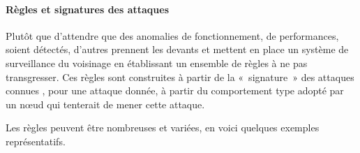        \paragraph{Règles et signatures des attaques}
Plutôt que d'attendre que des anomalies de fonctionnement, de performances, soient détectés, d'autres \IDS prennent les devants et mettent en place un système de surveillance du voisinage en établissant un ensemble de règles à ne pas transgresser.
Ces règles sont construites à partir de la « signature » des attaques connues \cad, pour une attaque donnée, à partir du comportement type adopté par un nœud qui tenterait de mener cette attaque.

Les règles peuvent être nombreuses et variées, en voici quelques exemples représentatifs.
